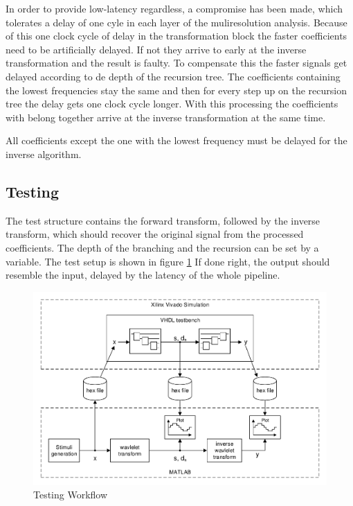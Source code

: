 \begin{refsection}
In order to provide low-latency regardless, a compromise has been made, which tolerates a delay of one cyle in each layer of the muliresolution analysis.
Because of this one clock cycle of delay in the transformation block the faster coefficients need to be artificially delayed.
If not they arrive to early at the inverse transformation and the result is faulty. To compensate this the   faster signals get delayed according to de depth of the recursion tree.
The coefficients containing the lowest frequencies stay the same and then for every step up on the recursion tree the delay gets one clock cycle longer.
With this processing the coefficients with belong together arrive at the inverse transformation at the same time.

All coefficients except the one with the lowest frequency must be delayed for the inverse algorithm.


\subsection{Testing}

The test structure contains the forward transform, followed by the inverse transform, which should recover the original signal from the processed coefficients.
The depth of the branching and the recursion can be set by a variable. 
The test setup is shown in figure \ref{fpga:fig:testing}
If done right, the output should resemble the input, delayed by the latency of the whole pipeline.

\begin{figure}
	\centering
	\includegraphics[width=\textwidth]{papers/fpga/images/vhdl_sim.pdf}
	\caption{Testing Workflow \label{fpga:fig:testing}}
\end{figure}


\end{refsection}
